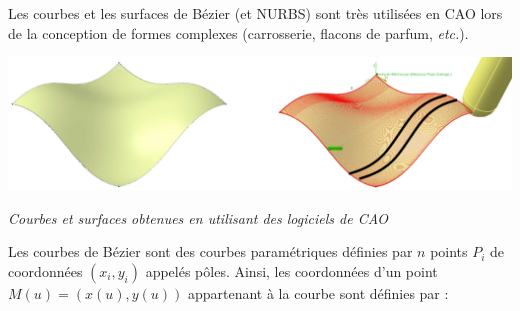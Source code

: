 \documentclass[10pt,fleqn]{article} %
\begin{document}



Les courbes et les surfaces de Bézier (et NURBS) sont très utilisées en CAO lors de la conception de formes complexes (carrosserie, flacons de parfum, \textit{etc.}).

\begin{center}
\includegraphics[width=.8\textwidth]{images/surf.png}
 
\textit{Courbes et surfaces obtenues en utilisant des logiciels de CAO }
\end{center}


Les courbes de Bézier sont des courbes paramétriques définies par $n$ points $P_i$ de coordonnées $\left(x_i,y_i\right)$ appelés pôles. Ainsi, les coordonnées d'un point $M(u)=\left(x(u),y(u)\right)$ appartenant à la courbe sont définies par : 
\end{document}
